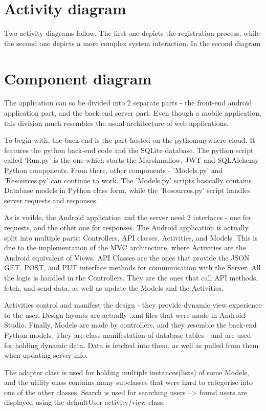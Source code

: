 			\eject

			  
		\section{Activity diagram}
		
		Two activity diagrams follow. The first one depicts the registration process, while the second one depicts a more complex system interaction.
		In the second diagram 
		
		\eject
			  
		\section{Component diagram}
			
			The application can so be divided into 2 separate parts - the front-end android application part, and the back-end server part. Even though a mobile application, this division much resembles the usual architecture of web applications.
			
			To begin with, the back-end is the part hosted on the pythonanywhere cloud. It features the python back-end code and the SQLite database. The python script called 'Run.py' is the one which starts the Marshmallow, JWT and SQLAlchemy Python components. From there, other components - 'Models.py' and 'Resources.py' can continue to work. The 'Models.py' scripts basically contains Database models in Python class form, while the 'Resources.py' script handles server requests and responses.
			
			As is visible, the Android application and the server need 2 interfaces - one for requests, and the other one for responses. The Android application is actually split into multiple parts: Controllers, API classes, Activities, and Models. This is due to the implementation of the MVC architecture, where Activities are the Android equivalent of Views. API Classes are the ones that provide the JSON GET, POST, and PUT interface methods for communication with the Server. All the logic is handled in the Controllers. They are the ones that call API methods, fetch, and send data, as well as update the Models and the Activities.
			
			Activities control and manifest the design - they provide dynamic view experience to the user. Design layouts are actually .xml files that were made in Android Studio. Finally, Models are made by controllers, and they resemble the back-end Python models. They are class manifestation of database tables - and are used for holding dynamic data. Data is fetched into them, as well as pulled from them when updating server info.
			
			The adapter class is used for holding multiple instances(lists) of some Models, and the utility class contains many subclasses that were hard to categorise into one of the other classes. Search is used for searching users --> found users are displayed using the defaultUser activity/view class.
		
			\eject
				